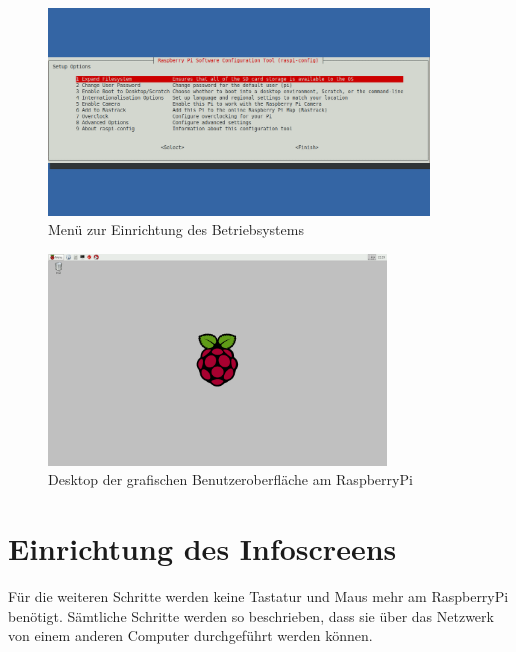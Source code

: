 \begin{figure}[h!]
	\centering
		\includegraphics[width=0.9\textwidth]{./fotos/menu1.png}
	\caption{Menü zur Einrichtung des Betriebsystems}
	\label{fig:menu}
\end{figure}

\begin{figure}[h!]
	\centering
		\includegraphics[width=0.8\textwidth]{./fotos/2015-02-08-222932_1920x1200_scrot.png}
	\caption{Desktop der grafischen Benutzeroberfläche am RaspberryPi}
	\label{fig:rpidesktop}
\end{figure}

\clearpage

\section{Einrichtung des Infoscreens}
\label{sec:stepssetup}
Für die weiteren Schritte werden keine Tastatur und Maus mehr am RaspberryPi benötigt. 
Sämtliche Schritte werden so beschrieben, dass sie über das Netzwerk von einem anderen Computer durchgeführt werden können.

